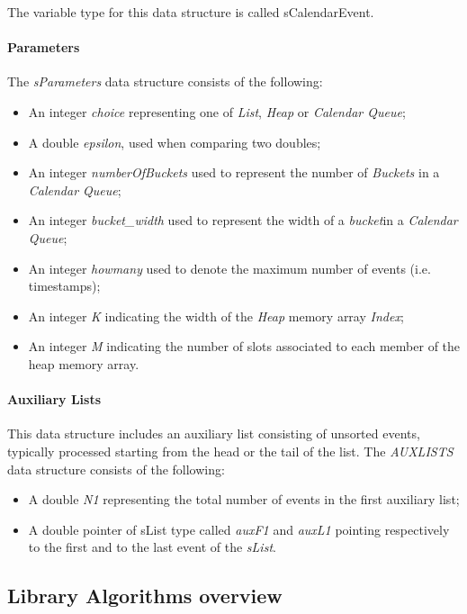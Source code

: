 The variable type for this data structure is called sCalendarEvent.

\paragraph{Parameters}
The \textit{sParameters}  data structure consists of the following:
\begin{itemize}
\item An integer \textit{choice} representing one of \textit{List}, \textit{Heap} or \textit{Calendar Queue};
\item A double \textit{epsilon}, used when comparing two doubles;
\item An integer \textit{numberOfBuckets} used to represent the number of \textit{Buckets} in a \textit{Calendar Queue};
\item An integer \textit{bucket\_width} used to represent the width of a \textit{bucket}in a \textit{Calendar Queue};
\item An integer \textit{howmany} used to denote the maximum number of events (i.e. timestamps);
\item An integer \textit{K} indicating the width of the \textit{Heap} memory array \textit{Index};
\item An integer \textit{M} indicating the number of slots associated to each member of the heap memory array.
\end{itemize}

\paragraph{Auxiliary Lists}
 This data structure includes an auxiliary list consisting of unsorted events, typically processed starting from the head or the tail of the list.
The \textit{AUXLISTS} data structure consists of the following:
\begin{itemize}
\item	A double \textit{N1} representing the total number of events in the first auxiliary list;
\item	A double pointer of sList type called \textit{auxF1} and \textit{auxL1} pointing respectively to the first and to the last event of the \textit{sList}.
\end{itemize}


\subsection{Library Algorithms overview}

